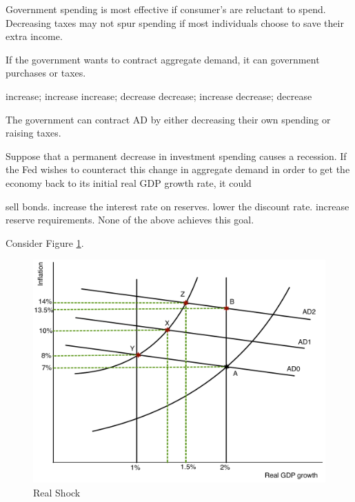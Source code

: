 \documentclass[addpoints,11pt]{exam}
\theoremstyle{definition}
\newcommand{\blank}[0]{\underline{\hspace{3cm}}}
\begin{document}
\begin{questions}
	\begin{solution}
		Government spending is most effective if consumer's are reluctant to spend. Decreasing taxes may not spur spending if most individuals choose to save their extra income.
	\end{solution}
	
\item If the government wants to contract aggregate demand, it can \blank government purchases or \blank taxes.

\begin{choices}
	\choice increase; increase
	\choice increase; decrease
	\CorrectChoice decrease; increase
	\choice decrease; decrease 
\end{choices}

\begin{solution}
	The government can contract AD by either decreasing their own spending or raising taxes.
\end{solution}

\newpage

\question Suppose that a permanent decrease in investment spending causes a recession. If the Fed wishes to counteract this change in aggregate demand in order to get the economy back to its initial real GDP growth rate, it could

\begin{choices}
	\choice sell bonds.
	\choice increase the interest rate on reserves.
	\CorrectChoice lower the discount rate. 
	\choice increase reserve requirements.
	\choice None of the above achieves this goal.
\end{choices}


	
\question Consider Figure \ref{fig1}.


\begin{figure}[H]
	\centering
	\includegraphics[scale=.45]{ec2_plot1.pdf}
	\caption{Real Shock}
	\label{fig1}
\end{figure}


\end{questions}
\end{document}
